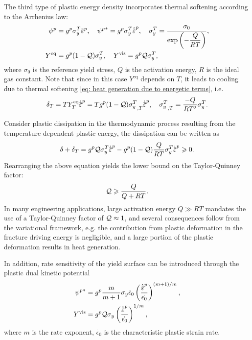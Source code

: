 The third type of plastic energy density incorporates thermal softening according to the Arrhenius law:
\begin{subequations}
  \begin{align}
    \psi^p      & = g^p \sigma_y^T \ep, \quad {\psi^p}^* = g^p \sigma_y^T \epdot, \quad \sigma_y^T = \dfrac{\sigma_0}{\exp\left( -\dfrac{Q}{RT} \right)}, \label{eq: temperature dependent flow stress} \\
    Y^\text{eq} & = g^p (1-\tqf) \sigma_y^T, \quad Y^\text{vis} = g^p \tqf \sigma_y^T,                                                                                                                  
  \end{align}
\end{subequations}
where $\sigma_0$ is the reference yield stress, $Q$ is the activation energy, $R$ is the ideal gas constant. Note that since in this case $Y^\text{eq}$ depends on $T$, it leads to cooling due to thermal softening \eqref{eq: heat generation due to energetic terms}, i.e.
\begin{align}
  \delta_T = TY^\text{eq}_T\epdot = T g^p (1-\tqf) {\sigma_y^T}_{,T}\epdot, \quad {\sigma_y^T}_{,T} = \dfrac{-Q}{RT^2} \sigma_y^T.
\end{align}

\begin{remark}
  Consider plastic dissipation in the thermodynamic process resulting from the temperature dependent plastic energy, the dissipation can be written as
  \begin{align}
    \delta + \delta_T = g^p \tqf \sigma_y^T \epdot - g^p (1-\tqf) \dfrac{Q}{RT} \sigma_y^T \epdot \geqslant 0.
  \end{align}
  Rearranging the above equation yields the lower bound on the Taylor-Quinney factor:
  \begin{align}
    \mathcal{Q} \geqslant \dfrac{Q}{Q+RT}.
  \end{align}
  In many engineering applications, large activation energy $Q \gg RT$ mandates the use of a Taylor-Quinney factor of $\mathcal{Q} \approx 1$, and several consequences follow from the variational framework, e.g. the contribution from plastic deformation in the fracture driving energy is negligible, and a large portion of the plastic deformation results in heat generation.
\end{remark}

In addition, rate sensitivity of the yield surface can be introduced through the plastic dual kinetic potential
\begin{subequations}
  \begin{align}
    {\psi^p}^*   & = g^p \dfrac{m}{m+1} \sigma_y \dot{\epsilon}_0 \left( \dfrac{\epdot}{\dot{\epsilon_0}} \right)^{(m+1)/m}, \\
    Y^\text{vis} & = g^p \tqf \sigma_y \left( \dfrac{\epdot}{\dot{\epsilon_0}} \right)^{1/m},                                
  \end{align}
\end{subequations}
where $m$ is the rate exponent, $\dot{\epsilon_0}$ is the characteristic plastic strain rate.

